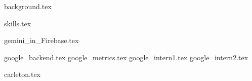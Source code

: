 \documentclass[11pt]{article}
\begin{document}
{background.tex}

\vspace{1mm}
{skills.tex}


{gemini_in_Firebase.tex}

{google_backend.tex}
\vspace{1mm}
{google_metrics.tex}
\vspace{1mm}
{google_intern1.tex}
\vspace{1mm}
{google_intern2.tex}


{carleton.tex}


\end{document}
